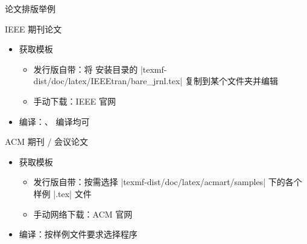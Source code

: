 \begin{frame}{论文排版举例}
  \begin{exampleblock}{IEEE 期刊论文}
    \begin{itemize}
      \item 获取模板
        \begin{itemize}
          \item 发行版自带：将 \TeXLive 安装目录的 |texmf-dist/doc/latex/IEEEtran/bare_jrnl.tex| 复制到某个文件夹并编辑
          \item 手动下载：IEEE 官网 
        \end{itemize}
      \item 编译：\XeLaTeX{}、\pdfLaTeX{} 编译均可
    \end{itemize}
  \end{exampleblock}
  \begin{exampleblock}{ACM 期刊 / 会议论文}
    \begin{itemize}
      \item 获取模板
        \begin{itemize}
          \item 发行版自带：按需选择 |texmf-dist/doc/latex/acmart/samples| 下的各个样例 |.tex| 文件
          \item 手动网络下载：ACM 官网 
        \end{itemize}
      \item 编译：按样例文件要求选择程序
    \end{itemize}
  \end{exampleblock}
\end{frame}

